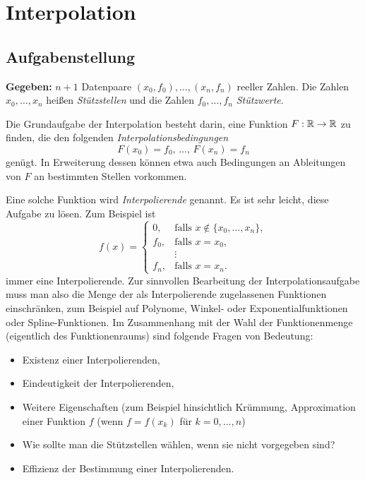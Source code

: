 \section{Interpolation}
\subsection{Aufgabenstellung}
\textbf{Gegeben:} $n+1$ Datenpaare $(x_0, f_0), \ldots, (x_n,f_n)$ reeller Zahlen. Die Zahlen $x_0, \ldots, x_n$ heißen \emph{Stützstellen} und die Zahlen $f_0, \ldots, f_n$ \emph{Stützwerte}.

Die Grundaufgabe der Interpolation besteht darin, eine Funktion $F: \mathbb{R} \to \mathbb{R}$ zu finden, die den folgenden \emph{Interpolationsbedingungen}
\begin{equation}
 F(x_0) = f_0,\, \ldots,\, F(x_n) = f_n \label{eq:int_bedingung}
\end{equation}
genügt. In Erweiterung dessen können etwa auch Bedingungen an Ableitungen von $F$ an bestimmten Stellen vorkommen.

Eine solche Funktion wird \emph{Interpolierende} genannt. Es ist sehr leicht, diese Aufgabe zu lösen. Zum Beispiel ist
\[ f(x) = \begin{cases}
           0, &\text{falls } x \notin \{ x_0, \ldots, x_n \}, \\
           f_0, &\text{falls } x = x_0, \\
            &\vdots \\
           f_n, &\text{falls } x = x_n.
          \end{cases} \]
immer eine Interpolierende. Zur sinnvollen Bearbeitung der Interpolationsaufgabe muss man also die Menge der als Interpolierende zugelassenen Funktionen einschränken, zum Beispiel auf Polynome, Winkel- oder Exponentialfunktionen oder Spline-Funktionen. Im Zusammenhang mit der Wahl der Funktionenmenge (eigentlich des Funktionenraums) sind folgende Fragen von Bedeutung:
\begin{itemize}
 \item Existenz einer Interpolierenden,
 \item Eindeutigkeit der Interpolierenden,
 \item Weitere Eigenschaften (zum Beispiel hinsichtlich Krümmung, Approximation einer Funktion $f$ (wenn $f = f(x_k)$ für $k=0,\ldots,n$)
 \item Wie sollte man die Stützstellen wählen, wenn sie nicht vorgegeben sind?
 \item Effizienz der Bestimmung einer Interpolierenden.
\end{itemize}

